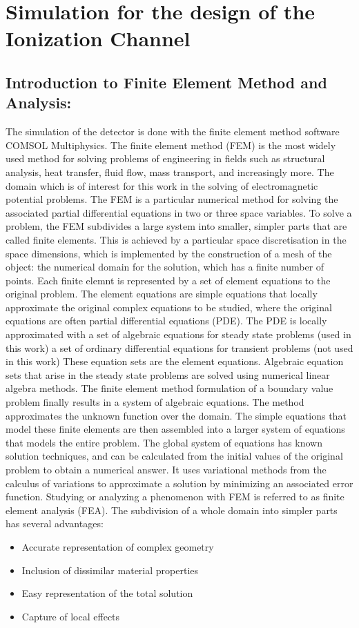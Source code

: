 \section{Simulation for the design of the Ionization Channel}


\subsection{Introduction to Finite Element Method and Analysis:}

The simulation of the detector is done with the finite element method software COMSOL Multiphysics.
The finite element method (FEM) is the most widely used method for solving problems of engineering in fields such as structural analysis, heat transfer, fluid flow, mass transport, and increasingly more. The domain which is of interest for this work in the solving of electromagnetic potential problems.  The FEM is a particular numerical method for solving the associated partial differential equations in two or three space variables. 
To solve a problem, the FEM subdivides a large system into smaller, simpler parts that are called finite elements. This is achieved by a particular space discretisation in the space dimensions, which is implemented by the construction of a mesh of the object: the numerical domain for the solution, which has a finite number of points. Each finite elemnt is represented by a set of element equations to the original problem. The element equations are simple equations that locally approximate the original complex equations to be studied, where the original equations are often partial differential equations (PDE). The PDE is locally approximated with 
a set of algebraic equations for steady state problems (used in this work)
a set of ordinary differential equations for transient problems (not used in this work)
These equation sets are the element equations. Algebraic equation sets that arise in the steady state problems are solved using numerical linear algebra methods.
The finite element method formulation of a boundary value problem finally results in a system of algebraic equations. The method approximates the unknown function over the domain. The simple equations that model these finite elements are then assembled into a larger system of equations that models the entire problem. The global system of equations has known solution techniques, and can be calculated from the initial values of the original problem to obtain a numerical answer. It uses variational methods from the calculus of variations to approximate a solution by minimizing an associated error function. 
Studying or analyzing a phenomenon with FEM is referred to as finite element analysis (FEA). 
The subdivision of a whole domain into simpler parts has several advantages:
\begin{itemize}
	\item Accurate representation of complex geometry 
	\item Inclusion of dissimilar material properties 
	\item Easy representation of the total solution 
	\item Capture of local effects
\end{itemize}

